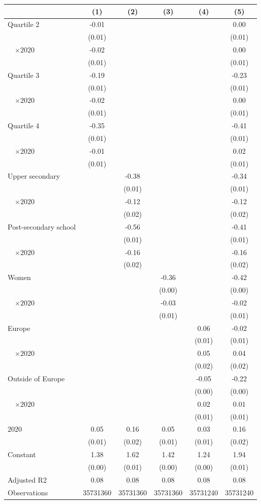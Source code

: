 
\begin{tabular}{@{}l*{5}{S[table-format={-}2.2{\tnote{***}}]}@{}}
\toprule
{} & {(1)} & {(2)} & {(3)} & {(4)} & {(5)}\tabularnewline%
\midrule
Quartile 2 & -0.01 &  &  &  & 0.00\tabularnewline%
 & (0.01) &  &  &  & \vphantom{5} (0.01)\tabularnewline%
~~\(\times 2020\) & -0.02 &  &  &  & \vphantom{1} 0.00\tabularnewline%
 & (0.01) &  &  &  & \vphantom{4} (0.01)\tabularnewline%
Quartile 3 & -0.19\tnote{***} &  &  &  & -0.23\tnote{***}\tabularnewline%
 & (0.01) &  &  &  & \vphantom{3} (0.01)\tabularnewline%
~~\(\times 2020\) & -0.02 &  &  &  & 0.00\tabularnewline%
 & (0.01) &  &  &  & \vphantom{2} (0.01)\tabularnewline%
Quartile 4 & -0.35\tnote{***} &  &  &  & -0.41\tnote{***}\tabularnewline%
 & (0.01) &  &  &  & \vphantom{1} (0.01)\tabularnewline%
~~\(\times 2020\) & -0.01 &  &  &  & 0.02\tnote{\dagger}\tabularnewline%
 & (0.01) &  &  &  & (0.01)\tabularnewline%
Upper secondary &  & -0.38\tnote{***} &  &  & -0.34\tnote{***}\tabularnewline%
 &  & (0.01) &  &  & \vphantom{1} (0.01)\tabularnewline%
~~\(\times 2020\) &  & -0.12\tnote{***} &  &  & -0.12\tnote{***}\tabularnewline%
 &  & (0.02) &  &  & \vphantom{1} (0.02)\tabularnewline%
Post-secondary school &  & -0.56\tnote{***} &  &  & -0.41\tnote{***}\tabularnewline%
 &  & (0.01) &  &  & (0.01)\tabularnewline%
~~\(\times 2020\) &  & -0.16\tnote{***} &  &  & -0.16\tnote{***}\tabularnewline%
 &  & (0.02) &  &  & (0.02)\tabularnewline%
Women &  &  & -0.36\tnote{***} &  & -0.42\tnote{***}\tabularnewline%
 &  &  & (0.00) &  & (0.00)\tabularnewline%
~~\(\times 2020\) &  &  & -0.03\tnote{**} &  & -0.02\tnote{\dagger}\tabularnewline%
 &  &  & (0.01) &  & (0.01)\tabularnewline%
Europe &  &  &  & 0.06\tnote{***} & -0.02\tnote{*}\tabularnewline%
 &  &  &  & (0.01) & \vphantom{1} (0.01)\tabularnewline%
~~\(\times 2020\) &  &  &  & 0.05\tnote{***} & 0.04\tnote{**}\tabularnewline%
 &  &  &  & (0.02) & (0.02)\tabularnewline%
Outside of Europe &  &  &  & -0.05\tnote{***} & -0.22\tnote{***}\tabularnewline%
 &  &  &  & (0.00) & (0.00)\tabularnewline%
~~\(\times 2020\) &  &  &  & 0.02\tnote{*} & 0.01\tabularnewline%
 &  &  &  & (0.01) & (0.01)\tabularnewline%
\midrule
\(2020\) & 0.05\tnote{***} & 0.16\tnote{***} & 0.05\tnote{***} & 0.03\tnote{***} & 0.16\tnote{***}\tabularnewline%
 & (0.01) & (0.02) & (0.01) & (0.01) & (0.02)\tabularnewline%
Constant & 1.38\tnote{***} & 1.62\tnote{***} & 1.42\tnote{***} & 1.24\tnote{***} & 1.94\tnote{***}\tabularnewline%
 & (0.00) & (0.01) & (0.00) & (0.00) & (0.01)\tabularnewline%
\midrule
Adjusted R2 & 0.08 & 0.08 & 0.08 & 0.08 & 0.08\tabularnewline%
Observations & {\num{35731360}} & {\num{35731360}} & {\num{35731360}} & {\num{35731240}} & {\num{35731240}}\tabularnewline%
\bottomrule
\end{tabular}
